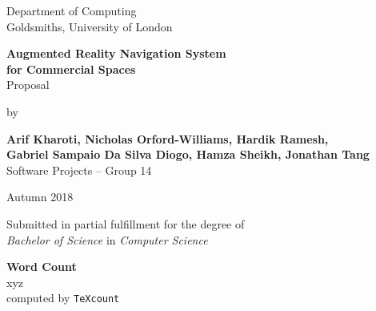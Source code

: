 \documentclass[12pt]{report}
\newcommand\blankpage{%
    \null
    \thispagestyle{empty}%
    \addtocounter{page}{-1}%
    \newpage}
\begin{document}
\begin{titlepage}
    \begin{center}
        \vspace*{1cm}
        Department of Computing\\
        Goldsmiths, University of London\\

        \vspace*{3.25cm}

        \textbf{\LARGE Augmented Reality Navigation System\\}
        \vspace*{0.20cm}           
        \textbf{\LARGE for Commercial Spaces}\\
        \vspace*{0.55cm}           
        {\large Proposal}\\
        \vspace*{0.15cm}           

        \vspace*{2cm}
        by\\
        \vspace*{0.25cm}   

        \textbf{Arif Kharoti, Nicholas Orford-Williams, Hardik Ramesh,\\}
        \textbf{Gabriel Sampaio Da Silva Diogo, Hamza Sheikh, Jonathan Tang\\}
        \vspace*{0.1cm}    
        Software Projects – Group 14\\  

        \vspace{2cm}

        Autumn 2018
        \vfill

        Submitted in partial fulfillment for the degree of\\
        \textit{Bachelor of Science} in \textit{Computer Science}

        \vspace{1.5cm}

    \end{center}
\end{titlepage}
\afterpage{\blankpage}
\thispagestyle{plain}

\begin{center}    
    \large
    \textbf{Word Count}\\
    xyz\\
    computed by \texttt{TeXcount}
\end{center}
\end{document}
